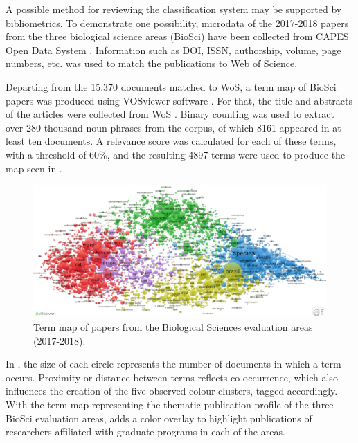 A possible method for reviewing the classification system may be supported by bibliometrics. To demonstrate one possibility, microdata of the 2017-2018  papers from the three biological science areas (BioSci) have been collected from CAPES Open Data System \autocite{CAPES.2021d}. Information such as DOI, ISSN, authorship, volume, page numbers, etc. was used to match the publications to Web of Science.

Departing from the 15.370 documents matched to WoS, a term map of BioSci papers was produced using VOSviewer software \autocite{Eck.2009}. For that, the title and abstracts of the articles were collected from WoS \autocite{Clarivate.2022}. Binary counting was used to extract over 280 thousand noun phrases from the corpus, of which 8161 appeared in at least ten documents. A relevance score was calculated for each of these terms, with a threshold of 60\%, and the resulting 4897 terms were used to produce the map seen in .

\begin{figure}[ht]
\vspace{8pt}
    \centering
    \includegraphics[width=1\textwidth]{images/chapter_classific/VOSviewer-CB-clusters.png}
    \caption{Term map of papers from the Biological Sciences evaluation areas (2017-2018).}
    \label{fig:classif:vosviewer_cb}
\end{figure}
 
In , the size of each circle represents the number of documents in which a term occurs. Proximity or distance between terms reflects co-occurrence, which also influences the creation of the five observed colour clusters, tagged accordingly. With the term map representing the thematic publication profile of the three BioSci evaluation areas,  adds a color overlay to highlight publications of researchers affiliated with graduate programs in each of the areas. 

